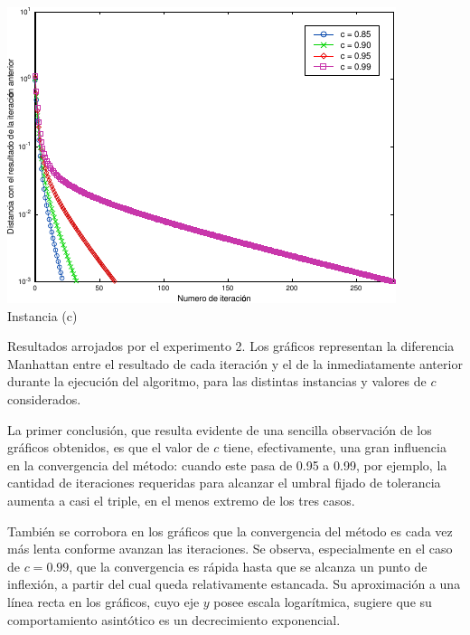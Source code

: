             \noindent{} \begin{minipage}{\textwidth}
                \begin{center}
                    \includegraphics{graficos/exp2-c.pdf} \\
                    {\small Instancia (c)}

                    \vspace{1em}

                    Resultados arrojados por el experimento 2. Los gráficos representan la diferencia Manhattan entre el resultado de cada iteración y el de la inmediatamente anterior durante la ejecución del algoritmo, para las distintas instancias y valores de $c$ considerados.

                    \vspace{1em}
                \end{center}
            \end{minipage}

            La primer conclusión, que resulta evidente de una sencilla observación de los gráficos obtenidos, es que el valor de $c$ tiene, efectivamente, una gran influencia en la convergencia del método: cuando este pasa de 0.95 a 0.99, por ejemplo, la cantidad de iteraciones requeridas para alcanzar el umbral fijado de tolerancia aumenta a casi el triple, en el menos extremo de los tres casos.

            También se corrobora en los gráficos que la convergencia del método es cada vez más lenta conforme avanzan las iteraciones. Se observa, especialmente en el caso de $c = 0.99$, que la convergencia es rápida hasta que se alcanza un punto de inflexión, a partir del cual queda relativamente estancada. Su aproximación a una línea recta en los gráficos, cuyo eje $y$ posee escala logarítmica, sugiere que su comportamiento asintótico es un decrecimiento exponencial.

